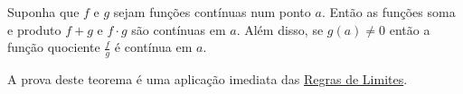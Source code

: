 \begin{theorem}
Suponha que $f$ e $g$ sejam funções contínuas num ponto $a$. Então as funções soma e produto $f+g$ e $f\cdot g$ são contínuas em $a$. Além disso, se $g(a)\neq 0$ então a função quociente $\frac{f}{g}$ é contínua em $a$.
\end{theorem}

A prova deste teorema é uma aplicação imediata das \href{../02.limites_elementares/teo_regras_lim_moodle.html}{Regras de Limites}.